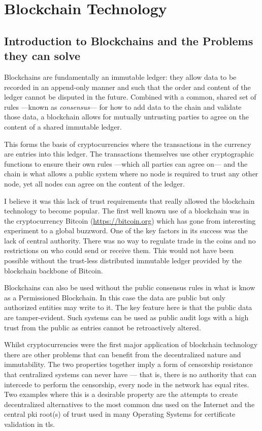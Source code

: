 
\chapter{Blockchain Technology}
\label{ch:blockchain}

\section{Introduction to Blockchains and the Problems they can solve}
\label{ch:blockchain:intro}

Blockchains are fundamentally an immutable ledger: they allow data to be recorded in an append-only manner and such that the order and content of the ledger cannot be disputed in the future. Combined with a common, shared set of rules ---known as \emph{consensus}--- for how to add data to the chain and validate those data, a blockchain allows for mutually untrusting parties to agree on the content of a shared immutable ledger.

This forms the basis of cryptocurrencies where the transactions in the currency are entries into this ledger. The transactions themselves use other cryptographic functions to ensure their own rules ---which all parties can agree on--- and the chain is what allows a public system where no node is required to trust any other node, yet all nodes can agree on the content of the ledger.

I believe it was this lack of trust requirements that really allowed the blockchain technology to become popular. The first well known use of a blockchain was in the cryptocurrency Bitcoin (\url{https://bitcoin.org}) which has gone from interesting experiment to a global buzzword. One of the key factors in its success was the lack of central authority. There was no way to regulate trade in the coins and no restrictions on who could send or receive them. This would not have been possible without the trust-less distributed immutable ledger provided by the blockchain backbone of Bitcoin.

Blockchains can also be used without the public consensus rules in what is know as a Permissioned Blockchain. In this case the data are public but only authorized entities may write to it. The key feature here is that the public data are tamper-evident. Such systems can be used as public audit logs with a high trust from the public as entries cannot be retroactively altered.

Whilst cryptocurrencies were the first major application of blockchain technology there are other problems that can benefit from the decentralized nature and immutability. The two properties together imply a form of censorship resistance that centralized systems can never have --- that is, there is no authority that can intercede to perform the censorship, every node in the network has equal rites. Two examples where this is a desirable property are  the attempts to create decentralized alternatives to the most common \gls{dns} used on the Internet  and the central \gls{pki} root(s) of trust used in many Operating Systems for certificate validation in \gls{tls}.


